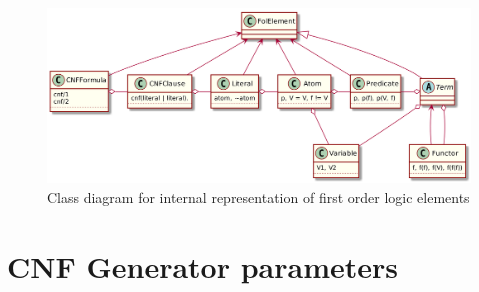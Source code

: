 \begin{figure}[h]
\begin{centering}
  \includegraphics[width=\textwidth]{logic-formula-generator/fol/cnf_fol_elements.png}
  \caption{Class diagram for internal representation of first order logic elements}
  \label{pic:fol_elements_class_diagram}
\end{centering}
\end{figure}

\section{CNF Generator parameters}

